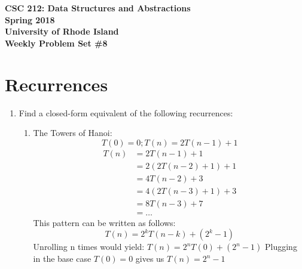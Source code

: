 \documentclass[11pt]{article}
\begin{document}
    \thispagestyle{empty}
    
    \begin{center}
        {\Large\bf CSC 212: Data Structures and Abstractions}\\
        \medskip
        {\Large\bf Spring 2018}\\
        \medskip
        {\Large\bf University of Rhode Island}\\
        \bigskip
        {\Large\bf Weekly Problem Set \#8}
    \end{center}
    
    \section{Recurrences}
    \begin{enumerate}
        \item Find a closed-form equivalent of the following recurrences:
        \begin{enumerate} 
            \item The Towers of Hanoi:
            $$T(0) = 0; T(n) = 2T(n-1) + 1$$
            \begin{equation} \label{eq1}
                \begin{split}
                    T(n) & = 2T(n-1) + 1 \\
                         & = 2(2T(n-2) + 1) + 1 \\
                         & = 4T(n-2) + 3 \\
                         & = 4(2T(n-3) + 1) + 3 \\
                         & = 8T(n-3) + 7 \\
                         & = \ldots
                \end{split}
            \end{equation}
            This pattern can be written as follows: $$T(n) = 2^kT(n-k) + (2^k - 1)$$ 
            Unrolling n times would yield: $T(n) = 2^nT(0) + (2^n - 1)$
            Plugging in the base case $T(0) = 0$ gives us $T(n) = 2^n - 1$
        

\end{enumerate}
\end{enumerate}
\end{document}
